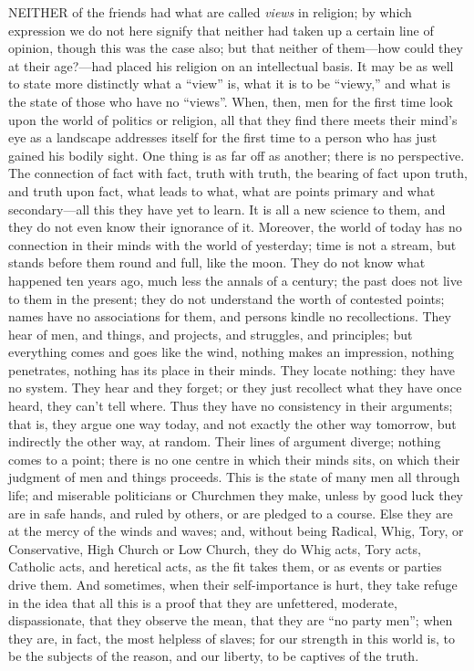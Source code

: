 NEITHER of the friends had what are
called \emph{views} in religion; by which expression we do not here signify
that neither had taken up a certain line of opinion, though this was
the case also; but that neither of them—how could they at their age?—had
placed his religion on an intellectual basis. It may be as well to
state more distinctly what a ``view'' is, what it is to be
``viewy,'' and what is the state of those who have no
``views''. When, then, men for the first time look upon the
world of politics or religion, all that they find there meets their
mind's eye as a landscape addresses itself for the first time to a
person who has just gained his bodily sight. One thing is as far off
as another; there is no perspective. The connection of fact with fact,
truth with truth, the bearing of fact upon truth, and truth upon fact,
what leads to what, what are points primary and what secondary—all
this they have yet to learn. It is all a new science to them, and they
do not even know their ignorance of it. Moreover, the world of today
has no connection in their minds with the world of yesterday; time is
not a stream, but stands before them round and full, like the moon.
They do not know what happened ten years ago, much less the
annals of a century; the past does not live to them in the present;
they do not understand the worth of contested points; names have no
associations for them, and persons kindle no recollections. They hear
of men, and things, and projects, and struggles, and principles; but
everything comes and goes like the wind, nothing makes an impression,
nothing penetrates, nothing has its place in their minds. They locate
nothing: they have no system. They hear and they forget; or they just
recollect what they have once heard, they can't tell where. Thus they
have no consistency in their arguments; that is, they argue one way
today, and not exactly the other way tomorrow, but indirectly the
other way, at random. Their lines of argument diverge; nothing comes
to a point; there is no one centre in which their minds sits, on which
their judgment of men and things proceeds. This is the state of many
men all through life; and miserable politicians or Churchmen they
make, unless by good luck they are in safe hands, and ruled by others,
or are pledged to a course. Else they are at the mercy of the winds
and waves; and, without being Radical, Whig, Tory, or Conservative,
High Church or Low Church, they do Whig acts, Tory acts, Catholic
acts, and heretical acts, as the fit takes them, or as events or
parties drive them. And sometimes, when their self-importance is hurt,
they take refuge in the idea that all this is a proof that they are
unfettered, moderate, dispassionate, that they observe the mean, that
they are ``no party men''; when they are, in fact, the
most helpless of slaves; for our strength in this world is, to be the
subjects of the reason, and our liberty, to be captives of the truth.

